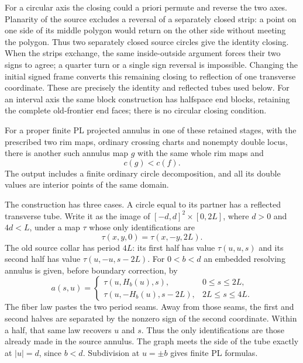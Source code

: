 For a circular axis the closing could a priori permute and reverse
the two axes.  Planarity of the source excludes a reversal of a
separately closed strip: a point on one side of its middle polygon
would return on the other side without meeting the polygon.
Thus two separately closed source circles give the identity closing.
When the strips exchange, the same inside-outside argument forces
their two signs to agree; a quarter turn or a single sign reversal
is impossible.  Changing the initial signed frame converts this
remaining closing to reflection of one transverse coordinate.
These are precisely the identity and reflected tubes used below.
For an interval axis the same block construction has halfspace
end blocks, retaining the complete old-frontier end faces; there is
no circular closing condition.

\begin{lemma}
\label{lem:dehn-annulus-decrease}
For a proper finite PL projected annulus in one of these retained
stages, with the prescribed two rim maps, ordinary crossing charts
and nonempty double locus, there is another such annulus map $g$
with the same whole rim maps and
\[
                           c(g)<c(f).
\]
The output includes a finite ordinary circle decomposition, and all
its double values are interior points of the same domain.
\end{lemma}

The construction has three cases.  A circle equal to its partner has
a reflected transverse tube.  Write it as the image of
$[-d,d]^2\times[0,2L]$, where $d>0$ and $4d<L$, under a map $\tau$
whose only identifications are
\[
                   \tau(x,y,0)=\tau(x,-y,2L).
\]
The old source collar has period $4L$: its first half has value
$\tau(u,u,s)$ and its second half has value
$\tau(u,-u,s-2L)$.  For $0<b<d$ an embedded resolving annulus is
given, before boundary correction, by
\[
 a(s,u)=
 \begin{cases}
 \tau(u,H_b(u),s),&0\leq s\leq2L,\\
 \tau(u,-H_b(u),s-2L),&2L\leq s\leq4L.
 \end{cases}
\]
The fiber law pastes the two period seams.  Away from those seams,
the first and second halves are separated by the nonzero sign of
the second coordinate.  Within a half, that same law recovers
$u$ and $s$.  Thus the only identifications are those already
made in the source annulus.  The graph meets the side of the tube
exactly at $|u|=d$, since $b<d$.  Subdivision at $u=\pm b$ gives
finite PL formulas.

